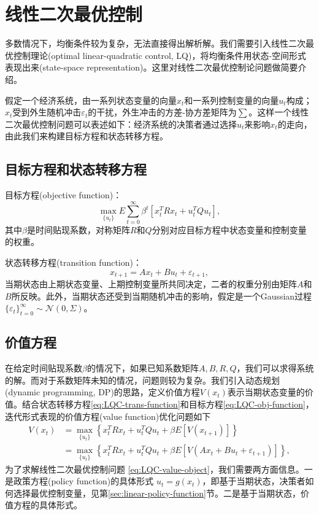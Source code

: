 \chapter{线性二次最优控制}
\label{sec:linear-quardratic-control-intro}
多数情况下，均衡条件较为复杂，无法直接得出解析解。我们需要引入线性二次最优控制理论(optimal linear-quadratic control, LQ)，将均衡条件用状态-空间形式表现出来(state-space representation)。这里对线性二次最优控制论问题做简要介绍。

假定一个经济系统，由一系列状态变量的向量$x_t$和一系列控制变量的向量$u_t$构成；$x_t$受到外生随机冲击$\varepsilon_t$的干扰，外生冲击的方差-协方差矩阵为$\sum$。这样一个线性二次最优控制问题可以表述如下：经济系统的决策者通过选择$u_t$来影响$x_t$的走向，由此我们来构建目标方程和状态转移方程。

\section{目标方程和状态转移方程}
目标方程(objective function)：
\begin{equation}
  \label{eq:LQC-obj-function}
  \max_{\{u_t\}} E \sum_{t=0}^{\infty} \beta^t \left[ x_t^T R x_t + u_t^T Q u_t\right],
\end{equation}
其中$\beta$是时间贴现系数，对称矩阵$R$和$Q$分别对应目标方程中状态变量和控制变量的权重。

状态转移方程(transition function)：
\begin{equation}
  \label{eq:LQC-trans-function}
  x_{t+1}=A x_t + B u_t + \varepsilon_{t+1},
\end{equation}
当期状态由上期状态变量、上期控制变量所共同决定，二者的权重分别由矩阵$A$和$B$所反映。此外，当期状态还受到当期随机冲击的影响，假定是一个Gaussian过程$\{\varepsilon_{t}\}_{t=0}^{\infty} \sim \mathcal{N}(0,\Sigma)$。

\section{价值方程}
在给定时间贴现系数$\beta$的情况下，如果已知系数矩阵$A,B,R,Q$，我们可以求得系统的解。而对于系数矩阵未知的情况，问题则较为复杂。我们引入动态规划(dynamic programming, DP)的思路，定义价值方程$V(x_t)$表示当期状态变量的价值。结合状态转移方程\eqref{eq:LQC-trans-function}和目标方程\eqref{eq:LQC-obj-function}，迭代形式表现的价值方程(value function)优化问题如下
\begin{align}
  \label{eq:LQC-value-object}
  V(x_t) &= \max_{\{u_t\}} \left\{
  x_t^T R x_t + u_t^T Q u_t + \beta E[V(x_{t+1})]
  \right\} \nonumber \\
  &=\max_{\{u_t\}} \left\{
  x_t^T R x_t + u_t^T Q u_t + \beta E[V(Ax_{t} + B u_{t} + \varepsilon_{t+1})]
  \right\},
\end{align}
为了求解线性二次最优控制问题  \eqref{eq:LQC-value-object}，我们需要两方面信息。一是政策方程(policy function)的具体形式 $u_t = g(x_t)$，即基于当期状态，决策者如何选择最优控制变量，见第\ref{sec:linear-policy-function}节。二是基于当期状态，价值方程的具体形式。

